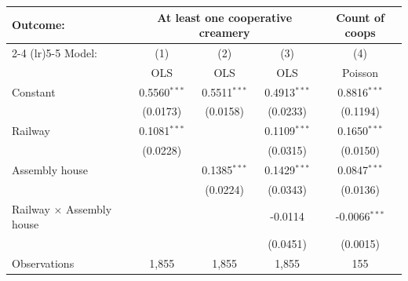 
\begin{tabular}{lcccc}
   \tabularnewline \midrule \midrule
   Outcome: & \multicolumn{3}{c}{At least one cooperative creamery} & Count of coops \\ \cmidrule(lr){2-4} \cmidrule(lr){5-5}
   Model:                           & (1)            & (2)            & (3)            & (4)\\  
                                    &  OLS           & OLS            & OLS            & Poisson\\  
      \midrule
   Constant                         & 0.5560$^{***}$ & 0.5511$^{***}$ & 0.4913$^{***}$ & 0.8816$^{***}$\\   
                                    & (0.0173)       & (0.0158)       & (0.0233)       & (0.1194)\\   
   Railway                          & 0.1081$^{***}$ &                & 0.1109$^{***}$ & 0.1650$^{***}$\\   
                                    & (0.0228)       &                & (0.0315)       & (0.0150)\\   
   Assembly house                   &                & 0.1385$^{***}$ & 0.1429$^{***}$ & 0.0847$^{***}$\\   
                                    &                & (0.0224)       & (0.0343)       & (0.0136)\\   
   Railway $\times$ Assembly house  &                &                & -0.0114        & -0.0066$^{***}$\\   
                                    &                &                & (0.0451)       & (0.0015)\\   
      \midrule
   Observations                     & 1,855          & 1,855          & 1,855          & 155\\  
      \midrule
      \midrule
\end{tabular}


